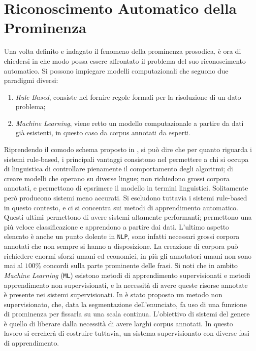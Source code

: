 \documentclass[twoside,twocolumn,10pt]{extarticle}
\theoremstyle{definition}
\begin{document}
\section{Riconoscimento Automatico della Prominenza}\label{sec:ric}
	Una volta definito e indagato il fenomeno della prominenza prosodica, è ora di chiedersi in che modo possa essere affrontato il problema del suo riconoscimento automatico. Si possono impiegare modelli computazionali che seguono due paradigmi diversi:
	\begin{enumerate}
		\item \textit{Rule Based}, consiste nel fornire regole formali per la risoluzione di un dato problema;
		\item \textit{Machine Learning}, viene retto un modello computazionale a partire da dati già esistenti, in questo caso da corpus annotati da esperti. 
	\end{enumerate}
	Riprendendo il comodo schema proposto in \cite{bib:prominence-by-acoustic-analyses}, si può dire che per quanto riguarda i sistemi rule-based, i principali vantaggi consistono nel permettere a chi si occupa di linguistica di controllare pienamente il comportamento degli algoritmi; di creare modelli che operano su diverse lingue; non richiedono grossi corpora annotati, e permettono di epsrimere il modello in termini linguistici. Solitamente però producono sistemi meno accurati. Si escludono tuttavia i sistemi rule-based in questo contesto, e ci si concentra sui metodi di apprendimento automatico. Questi ultimi permettono di avere sistemi altamente performanti; permettono una più veloce classificazione e apprendono a partire dai dati. L'ultimo aspetto elencato è anche un punto dolente in \texttt{NLP}, sono infatti necessari grossi corpora annotati che non sempre si hanno a disposizione. La creazione di corpora può richiedere enormi sforzi umani ed economici, in più gli annotatori umani non sono mai al $100\%$ concordi sulla parte prominente delle frasi. Si noti che in ambito \textit{Machine Learning} (\texttt{ML}) esistono metodi di apprendimento supervisionati e metodi apprendimento non supervisionati, e la necessità di avere queste risorse annotate è presente nei sistemi supervisionati. In \cite[Sezione 4.2]{bib:fenomeni-prosodici-prominenza} è stato proposto un metodo non supervisionato, che, data la segmentazione dell'enunciato, fa uso di una funzione di prominenza per fissarla su una scala continua. L'obiettivo di sistemi del genere è quello di liberare dalla necessità di avere larghi corpus annotati. In questo lavoro si cercherà di costruire tuttavia, un sistema supervisionato con diverse fasi di apprendimento. 
	
\end{document}
